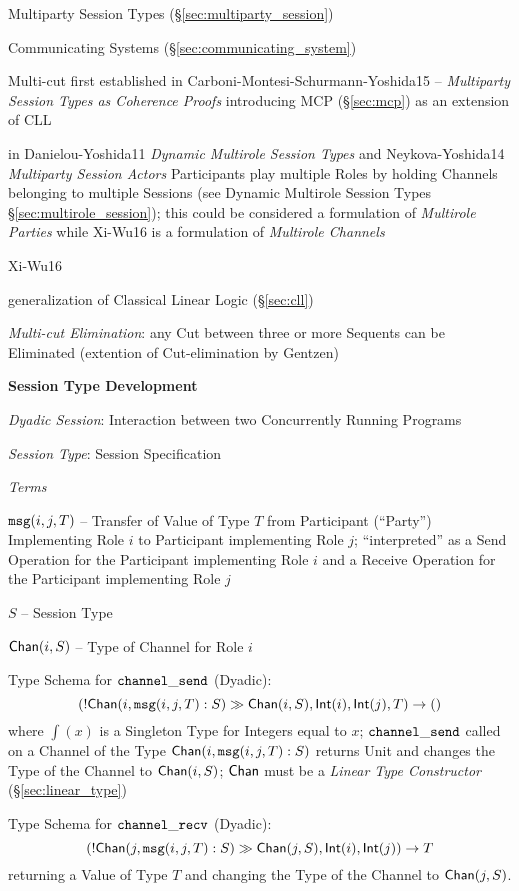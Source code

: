 \fist Multiparty Session Types (\S\ref{sec:multiparty_session})

\fist Communicating Systems (\S\ref{sec:communicating_system})

Multi-cut first established in Carboni-Montesi-Schurmann-Yoshida15 --
\emph{Multiparty Session Types as Coherence Proofs} introducing MCP
(\S\ref{sec:mcp}) as an extension of CLL

\fist in Danielou-Yoshida11 \emph{Dynamic Multirole Session Types} and
Neykova-Yoshida14 \emph{Multiparty Session Actors} Participants play
multiple Roles by holding Channels belonging to multiple Sessions (see
Dynamic Multirole Session Types \S\ref{sec:multirole_session}); this
could be considered a formulation of \emph{Multirole Parties} while
Xi-Wu16 is a formulation of \emph{Multirole Channels}


\asterism

Xi-Wu16

generalization of Classical Linear Logic (\S\ref{sec:cll})

\emph{Multi-cut Elimination}: any Cut between three or more Sequents
can be Eliminated (extention of Cut-elimination by Gentzen)


\textbf{Session Type Development}

\emph{Dyadic Session}: Interaction between two Concurrently Running Programs

\emph{Session Type}: Session Specification

\emph{Terms}

$\mathtt{msg}(i,j,T)$ -- Transfer of Value of Type $T$ from Participant
(``Party'') Implementing Role $i$ to Participant implementing Role
$j$; ``interpreted'' as a Send Operation for the Participant
implementing Role $i$ and a Receive Operation for the Participant
implementing Role $j$

$S$ -- Session Type

$\mathsf{Chan}(i,S)$ -- Type of Channel for Role $i$

Type Schema for $\mathtt{channel\_send}$ (Dyadic):
\[
  (!\mathsf{Chan} (i, \mathtt{msg}(i,j,T):S) \gg \mathsf{Chan}(i,S), \mathsf{Int}(i), \mathsf{Int}(j), T)
    \rightarrow \mathsf{()}
\]
where $\int(x)$ is a Singleton Type for Integers equal to $x$;
$\mathtt{channel\_send}$ called on a Channel of the Type
$\mathsf{Chan}(i, \mathtt{msg}(i,j,T):S)$ returns Unit and changes the
Type of the Channel to $\mathsf{Chan}(i,S)$; $\mathsf{Chan}$ must be a
\emph{Linear Type Constructor} (\S\ref{sec:linear_type})

Type Schema for $\mathtt{channel\_recv}$ (Dyadic):
\[
  (!\mathsf{Chan} (j, \mathtt{msg}(i,j,T):S) \gg \mathsf{Chan}(j,S), \mathsf{Int}(i), \mathsf{Int}(j))
    \rightarrow T
\]
returning a Value of Type $T$ and changing the Type of the Channel to
$\mathsf{Chan}(j,S)$.

